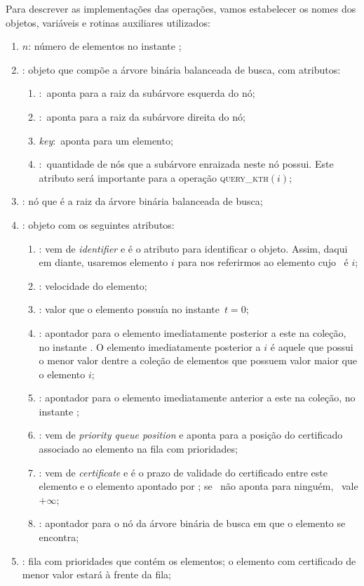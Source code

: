 Para descrever as implementações das operações, vamos
estabelecer os nomes dos objetos, variáveis e rotinas
auxiliares utilizados:
\begin{enumerate}
    \item $n$: número de elementos no instante \now;
    \item \no: objeto que compõe a árvore binária balanceada
    de busca, com atributos:
    \begin{enumerate}
        \item \esq$:$ aponta para a raiz da subárvore
        esquerda do nó;
        \item \dir$:$ aponta para a raiz da subárvore
        direita do nó;
        \item \textit{key}$:$ aponta para um elemento;
        \item \children$:$ quantidade de nós que a subárvore
        enraizada neste nó possui.
        Este atributo será importante para a operação \textsc{query\_kth}$(i)$;
    \end{enumerate}
    \item \raiz: nó que é a raiz da árvore binária balanceada de
    busca;
    \item \elemento: objeto com os seguintes atributos:
    \begin{enumerate}
        \item \id: vem de \textit{identifier} e é o atributo
        para identificar o objeto.
        Assim, daqui em diante, usaremos elemento $i$ para nos
        referirmos ao elemento cujo \id~é $i$;
        \item \speed: velocidade do elemento;
        \item \initv: valor que o elemento possuía no
        instante~$t = 0$;
        \item \nex: apontador para o elemento imediatamente
        posterior a este na coleção, no instante \now.
        O elemento imediatamente posterior a $i$ é aquele
        que possui o menor valor dentre a coleção de
        elementos que possuem valor maior que o elemento
        $i$;
        \item \prev: apontador para o elemento imediatamente
        anterior a este na coleção, no instante \now;
        \item \pqpos: vem de \textit{priority queue position} e
        aponta para a posição do certificado associado
        ao elemento na fila com prioridades;
        \item \cert: vem de \textit{certificate} e é o prazo de
        validade do certificado entre este elemento e o elemento
        apontado por \prev; se \prev~não aponta para ninguém,
        \cert~vale $+\infty$;
        \item \no: apontador para o nó da árvore binária de busca em
        que o elemento se encontra;
    \end{enumerate}
    \item \Q: fila com prioridades que contém os elementos;
    o elemento com certificado de menor valor estará à frente da fila;


\end{enumerate}
